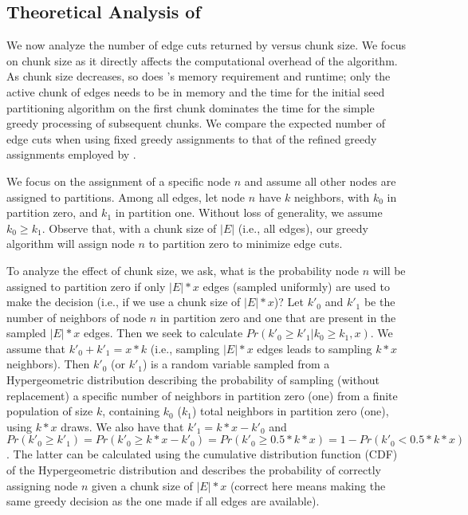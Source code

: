 \subsection{Theoretical Analysis of \partitioning}
\label{subsec:partitioning_analysis}

We now analyze the number of edge cuts returned by \partitioning versus chunk size. We focus on chunk size as it directly affects the computational overhead of the algorithm. As chunk size decreases, so does \partitioning's memory requirement and runtime; only the active chunk of edges needs to be in memory and the time for the initial seed partitioning algorithm on the first chunk dominates the time for the simple greedy processing of subsequent chunks. We compare the expected number of edge cuts when using fixed greedy assignments to that of the refined greedy assignments employed by \partitioning.

We focus on the assignment of a specific node $n$ and assume all other nodes are assigned to partitions. Among all edges, let node $n$ have $k$ neighbors, with $k_0$ in partition zero, and $k_1$ in partition one. Without loss of generality, we assume $k_0 \ge k_1$. Observe that, with a chunk size of $|E|$ (i.e., all edges), our greedy algorithm will assign node $n$ to partition zero to minimize edge cuts. 

To analyze the effect of chunk size, we ask, what is the probability node $n$ will be assigned to partition zero if only $|E|*x$ edges (sampled uniformly) are used to make the decision (i.e., if we use a chunk size of $|E|*x$)? Let $k'_0$ and $k'_1$ be the number of neighbors of node $n$ in partition zero and one that are present in the sampled $|E|*x$ edges. Then we seek to calculate $Pr(k'_0 \ge k'_1 | k_0 \ge k_1, x)$. We assume that $k'_0 + k'_1 = x*k$ (i.e., sampling $|E|*x$ edges leads to sampling $k*x$ neighbors). Then $k'_0$ (or $k'_1$) is a random variable sampled from a Hypergeometric distribution describing the probability of sampling (without replacement) a specific number of neighbors in partition zero (one) from a finite population of size $k$, containing $k_0$ ($k_1$) total neighbors in partition zero (one), using $k*x$ draws. We also have that $k'_1 = k*x - k'_0$ and $Pr(k'_0 \ge k'_1) = Pr(k'_0 \ge k*x - k'_0) = Pr(k'_0 \ge 0.5*k*x) = 1 - Pr(k'_0 < 0.5*k*x)$. The latter can be calculated using the cumulative distribution function (CDF) of the Hypergeometric distribution and describes the probability of correctly assigning node $n$ given a chunk size of $|E|*x$ (correct here means making the same greedy decision as the one made if all edges are available).

